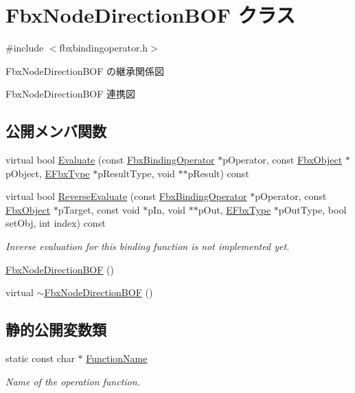 \hypertarget{class_fbx_node_direction_b_o_f}{}\section{Fbx\+Node\+Direction\+B\+OF クラス}
\label{class_fbx_node_direction_b_o_f}


{\ttfamily \#include $<$fbxbindingoperator.\+h$>$}



Fbx\+Node\+Direction\+B\+OF の継承関係図


Fbx\+Node\+Direction\+B\+OF 連携図
\subsection*{公開メンバ関数}
\begin{DoxyCompactItemize}
\item 
virtual bool \hyperlink{class_fbx_node_direction_b_o_f_a2366e8ea542715bd9bb4c4e865e4978c}{Evaluate} (const \hyperlink{class_fbx_binding_operator}{Fbx\+Binding\+Operator} $\ast$p\+Operator, const \hyperlink{class_fbx_object}{Fbx\+Object} $\ast$p\+Object, \hyperlink{fbxpropertytypes_8h_a73913a5ddfb20e57c6f25e9e6784bd92}{E\+Fbx\+Type} $\ast$p\+Result\+Type, void $\ast$$\ast$p\+Result) const
\item 
virtual bool \hyperlink{class_fbx_node_direction_b_o_f_ae550509066a010d97d92777df2cba41e}{Reverse\+Evaluate} (const \hyperlink{class_fbx_binding_operator}{Fbx\+Binding\+Operator} $\ast$p\+Operator, const \hyperlink{class_fbx_object}{Fbx\+Object} $\ast$p\+Target, const void $\ast$p\+In, void $\ast$$\ast$p\+Out, \hyperlink{fbxpropertytypes_8h_a73913a5ddfb20e57c6f25e9e6784bd92}{E\+Fbx\+Type} $\ast$p\+Out\+Type, bool set\+Obj, int index) const
\begin{DoxyCompactList}\small\item\em Inverse evaluation for this binding function is not implemented yet. \end{DoxyCompactList}\item 
\hyperlink{class_fbx_node_direction_b_o_f_a8e7616976dab63af690ea44d96f10813}{Fbx\+Node\+Direction\+B\+OF} ()
\item 
virtual \hyperlink{class_fbx_node_direction_b_o_f_a68e309ed65613ce119511f57fcc9ac91}{$\sim$\+Fbx\+Node\+Direction\+B\+OF} ()
\end{DoxyCompactItemize}
\subsection*{静的公開変数類}
\begin{DoxyCompactItemize}
\item 
static const char $\ast$ \hyperlink{class_fbx_node_direction_b_o_f_a653e830c1b1480a48f55cd980fe54f91}{Function\+Name}
\begin{DoxyCompactList}\small\item\em Name of the operation function. \end{DoxyCompactList}\end{DoxyCompactItemize}


